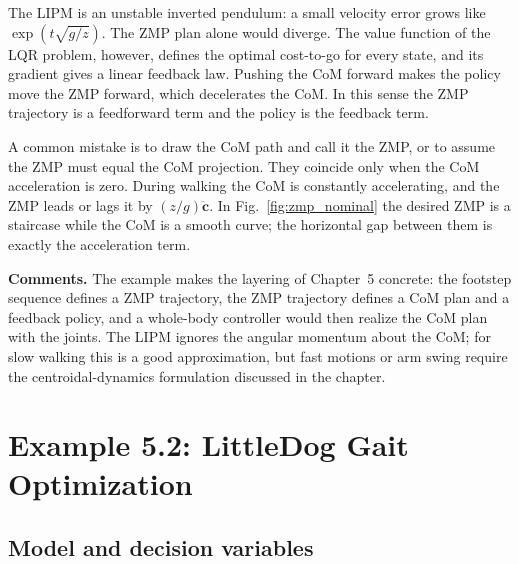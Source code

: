 \documentclass[11pt]{article}
\begin{document}
\begin{intuition}[breakable=false,title={Why a ZMP planner is a feedback controller}]
The LIPM is an unstable inverted pendulum: a small velocity error grows like
$\exp(t\sqrt{g/z})$.  The ZMP plan alone would diverge.  The value function of
the LQR problem, however, defines the optimal cost-to-go for every state, and
its gradient gives a linear feedback law.  Pushing the CoM forward makes the
policy move the ZMP forward, which decelerates the CoM.  In this sense the ZMP
trajectory is a feedforward term and the policy is the feedback term.
\end{intuition}

\begin{pitfall}[breakable=false,title={The ZMP is not the CoM}]
A common mistake is to draw the CoM path and call it the ZMP, or to assume the
ZMP must equal the CoM projection.  They coincide only when the CoM
acceleration is zero.  During walking the CoM is constantly accelerating, and
the ZMP leads or lags it by $(z/g)\ddot{\mathbf{c}}$.  In
Fig.~\ref{fig:zmp_nominal} the desired ZMP is a staircase while the CoM is a
smooth curve; the horizontal gap between them is exactly the acceleration
term.
\end{pitfall}

\textbf{Comments.}  The example makes the layering of Chapter~5 concrete: the
footstep sequence defines a ZMP trajectory, the ZMP trajectory defines a CoM
plan and a feedback policy, and a whole-body controller would then realize the
CoM plan with the joints.  The LIPM ignores the angular momentum about the
CoM; for slow walking this is a good approximation, but fast motions or arm
swing require the centroidal-dynamics formulation discussed in the chapter.

\section{Example 5.2: LittleDog Gait Optimization}

\subsection{Model and decision variables}
\end{document}

